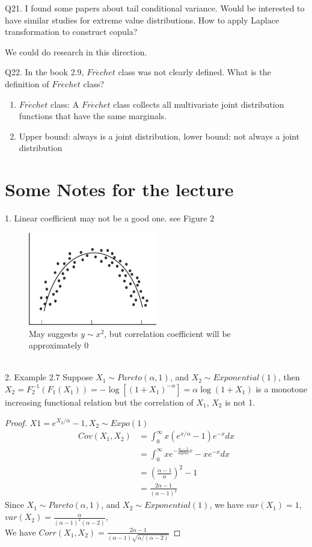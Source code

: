 \documentclass[a4paper,12pt]{texMemo}
\begin{document}
Q21. I found some papers about tail conditional variance. Would be interested to have similar studies for extreme value distributions. How to apply Laplace transformation to construct copula?

We could do research in this direction.

Q22. In the book 2.9, $Fr\acute{e}chet$ class was not clearly defined. What is the definition of $Fr\acute{e}chet$ class?

\begin{enumerate}
\item $Fr\acute{e}chet$ class: A $Fr\acute{e}chet$ class collects all multivariate joint distribution functions that have the same marginals.
\item Upper bound: always is a joint distribution, lower bound: not always a joint distribution
\end{enumerate}

\section{Some Notes for the lecture}
1. Linear coefficient may not be a good one. see Figure 2
\begin{figure}
\centering
\includegraphics[width = 0.5\textwidth]{nonlinear.png}
\caption{\label{fig: non-linear correlation}May suggests $y \sim x^2$, but correlation coefficient will be approximately 0}
\end{figure}
\\
2. Example 2.7 Suppose $X_1 \sim Pareto(\alpha, 1)$, and $X_2 \sim Exponential(1)$, then $X_2 = F_2^{-1}(F_1(X_1)) = -\log[(1+X_1)^{-\alpha}] = \alpha \log(1+X_1)$ is a monotone increasing functional relation but the correlation of $X_1$, $X_2$ is not 1.
\begin{proof}
$X1 = e^{X_2/\alpha} - 1, X_2 \sim Expo(1)$
\begin{align*}
Cov(X_1, X_2)
& = \int_0^{\infty} x(e^{x/\alpha} - 1) e^{-x} dx\\
& = \int_0^{\infty} x e^{-\frac{\alpha - 1}{alpha}x} - x e^{-x} dx\\
& = (\frac{\alpha - 1}{\alpha})^2 - 1 \\
& = \frac{2\alpha - 1}{(\alpha - 1)^2}
\end{align*}
Since $X_1 \sim Pareto(\alpha, 1)$, and $X_2 \sim Exponential(1)$, we have $var(X_1) = 1$, $var(X_2) = \frac{\alpha}{(\alpha - 1)^2 (\alpha - 2)}$,\\
We have $Corr(X_1, X_2) = \frac{2\alpha - 1}{(\alpha - 1)\sqrt{\alpha/(\alpha - 2)}}$
\end{proof}
\end{document}
